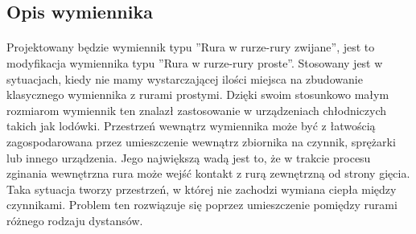 \subsection{Opis wymiennika}

\paragraph{}{
    Projektowany będzie wymiennik typu ''Rura w rurze-rury zwijane'', jest to modyfikacja wymiennika typu ''Rura w rurze-rury proste''.
    Stosowany jest w sytuacjach, kiedy nie mamy wystarczającej ilości miejsca na zbudowanie klasycznego wymiennika z rurami prostymi. Dzięki swoim stosunkowo małym rozmiarom wymiennik ten znalazł zastosowanie w urządzeniach chłodniczych takich jak lodówki.
    Przestrzeń wewnątrz wymiennika może być z łatwością zagospodarowana przez umieszczenie wewnątrz zbiornika na czynnik, sprężarki lub innego urządzenia.
    Jego największą wadą jest to, że w trakcie procesu zginania wewnętrzna rura może wejść kontakt z rurą zewnętrzną od strony gięcia.
    Taka sytuacja tworzy przestrzeń, w której nie zachodzi wymiana ciepła między czynnikami.
    Problem ten rozwiązuje się poprzez umieszczenie pomiędzy rurami różnego rodzaju dystansów.
}